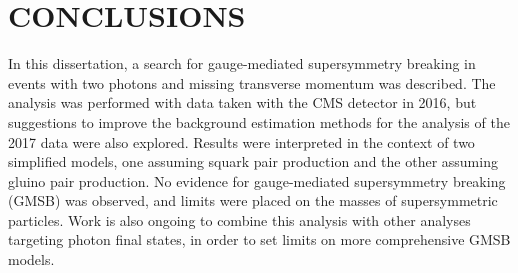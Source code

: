 \chapter{CONCLUSIONS}
\label{chap:Conclusions}

In this dissertation, a search for gauge-mediated supersymmetry breaking in events with two photons and missing transverse momentum was described. The analysis was performed with data taken with the CMS detector in 2016, but suggestions to improve the background estimation methods for the analysis of the 2017 data were also explored. Results were interpreted in the context of two simplified models, one assuming squark pair production and the other assuming gluino pair production.  No evidence for gauge-mediated supersymmetry breaking (GMSB) was observed, and limits were placed on the masses of supersymmetric particles. Work is also ongoing to combine this analysis with other analyses targeting photon final states, in order to set limits on more comprehensive GMSB models. 